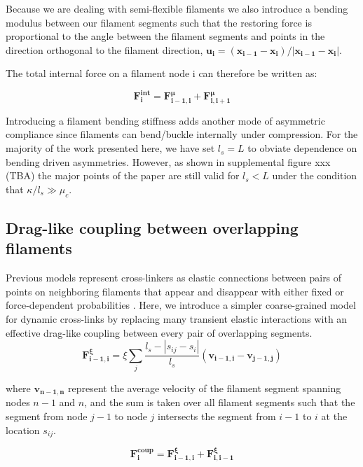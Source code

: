 Because we are dealing with semi-flexible filaments we also introduce a bending modulus between our filament segments such that the restoring force is proportional to the angle between the filament segments and points in the direction orthogonal to the filament direction, $\mathbf{u_i}=(\mathbf{x_{i-1}}-\mathbf{x_{i}})/|\mathbf{x_{i-1}}-\mathbf{x_{i}}|$.   


The total internal force on a filament node i can therefore be written as:

\begin{equation}
\label{eqn:internal}
\mathbf{F^{int}_i} = \mathbf{F^{\mu}_{i-1,i}} + \mathbf{F^{\mu}_{i,i+1}} 
\end{equation}

Introducing a filament bending stiffness adds another mode of asymmetric compliance since filaments can bend/buckle internally under compression. For the majority of the work presented here, we have set $l_s=L$ to obviate dependence on bending driven asymmetries. However, as shown in supplemental figure xxx (TBA)  the major points of the paper are still valid for $l_s<L$ under the condition that $\kappa/l_s\gg\mu_c$. 

\subsection{Drag-like coupling between overlapping filaments}
\label{exp_drag}
Previous models represent cross-linkers as elastic connections between pairs of points on neighboring filaments that appear and disappear with either fixed or force-dependent probabilities \cite{model_taeyoon,theo_crosslinknonlinear}.  Here, we introduce a simpler coarse-grained model for dynamic cross-links by replacing many transient elastic interactions with an effective drag-like coupling between every pair of overlapping segments.
\begin{equation}
\label{eqn:drag}
\mathbf{F^{\xi}_{i-1,i}} = \xi \sum_j \frac{l_s-|s_{ij}-s_i|}{l_s}  (\mathbf{v_{i-1,i}}-\mathbf{v_{j-1,j}}) 
\end{equation}

where $\mathbf{v_{n-1,n}}$ represent the average velocity of the filament segment spanning nodes $n-1$ and $n$, and the sum is taken over all filament segments such that the segment from node $j-1$ to node $j$ intersects the segment from $i-1$ to $i$ at the location $s_{ij}$.

\begin{equation}
\label{eqn:drag}
\mathbf{F^{coup}_{i}} = \mathbf{F^{\xi}_{i-1,i}} + \mathbf{F^{\xi}_{i,i-1}} 
\end{equation}

